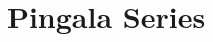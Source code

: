 \documentclass[journal,12pt,twocolumn]{IEEEtran}
\begin{document}
	\let\StandardTheFigure\thefigure
	\renewcommand{\thefigure}{\theproblem}
	
	
	
	\def\putbox#1#2#3{\makebox[0in][l]{\makebox[#1][l]{}\raisebox{\baselineskip}[0in][0in]{\raisebox{#2}[0in][0in]{#3}}}}
	\def\rightbox#1{\makebox[0in][r]{#1}}
	\def\centbox#1{\makebox[0in]{#1}}
	\def\topbox#1{\raisebox{-\baselineskip}[0in][0in]{#1}}
	\def\midbox#1{\raisebox{-0.5\baselineskip}[0in][0in]{#1}}
	
	\vspace{3cm}
	
	\title{ 
		Pingala Series
	}
	
	
	
\end{document}
